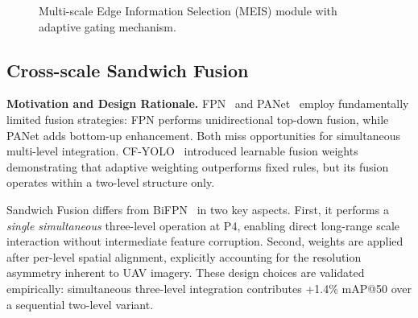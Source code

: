 \documentclass[preprint,12pt]{elsarticle}
\begin{document}
\begin{figure}[H]
{
}%
\caption{Multi-scale Edge Information Selection (MEIS) module with adaptive
gating mechanism.}
\label{fig:meis}
\end{figure}


\subsection{Cross-scale Sandwich Fusion}

\textbf{Motivation and Design Rationale.}
FPN~\cite{fpn} and PANet~\cite{panet} employ fundamentally limited fusion
strategies: FPN performs unidirectional top-down fusion, while PANet adds
bottom-up enhancement. Both miss opportunities for simultaneous multi-level
integration. CF-YOLO~\cite{cf-yolo} introduced learnable fusion weights
demonstrating that adaptive weighting outperforms fixed rules, but its fusion
operates within a two-level structure only.

Sandwich Fusion differs from BiFPN~\cite{efficientdet} in two key aspects.
First, it performs a \emph{single simultaneous} three-level operation at P4,
enabling direct long-range scale interaction without intermediate feature
corruption. Second, weights are applied after per-level spatial alignment,
explicitly accounting for the resolution asymmetry inherent to UAV imagery. These
design choices are validated empirically: simultaneous three-level integration
contributes +1.4\% mAP@50 over a sequential two-level variant.
\end{document}
